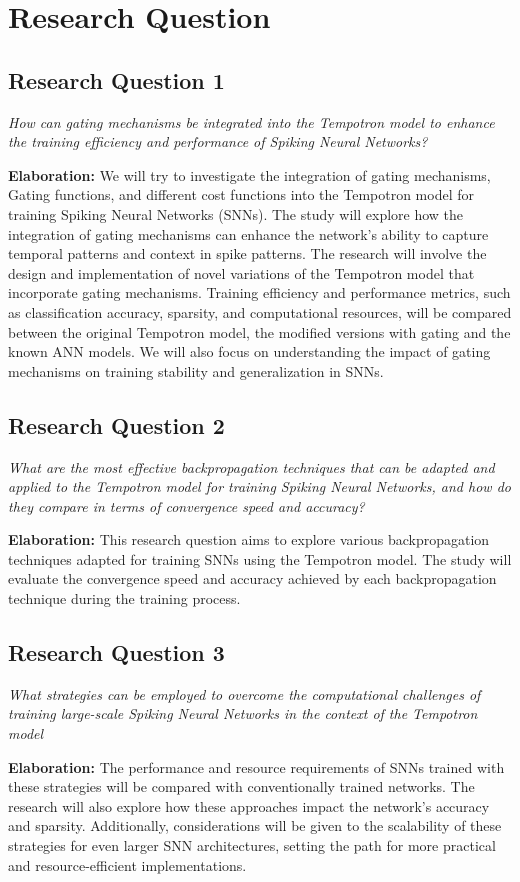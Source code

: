 \chapter{Research Question}
\label{chap:rq}

\section*{Research Question 1}
\textit{How can gating mechanisms be integrated into the Tempotron model to enhance the training efficiency and performance of Spiking Neural Networks?}

\textbf{Elaboration:}
We will try to investigate the integration of gating mechanisms, Gating functions, and different cost functions into the Tempotron model for training Spiking Neural Networks (SNNs). The study will explore how the integration of gating mechanisms can enhance the network's ability to capture temporal patterns and context in spike patterns. The research will involve the design and implementation of novel variations of the Tempotron model that incorporate gating mechanisms. Training efficiency and performance metrics, such as classification accuracy, sparsity, and computational resources, will be compared between the original Tempotron model, the modified versions with gating and the known ANN models. We will also focus on understanding the impact of gating mechanisms on training stability and generalization in SNNs.

\section*{Research Question 2}
\textit{What are the most effective backpropagation techniques that can be adapted and applied to the Tempotron model for training Spiking Neural Networks, and how do they compare in terms of convergence speed and accuracy?}

\textbf{Elaboration:}
This research question aims to explore various backpropagation techniques adapted for training SNNs using the Tempotron model. The study will evaluate the convergence speed and accuracy achieved by each backpropagation technique during the training process.

\section*{Research Question 3}
\textit{What strategies can be employed to overcome the computational challenges of training large-scale Spiking Neural Networks in the context of the Tempotron model}

\textbf{Elaboration:}
The performance and resource requirements of SNNs trained with these strategies will be compared with conventionally trained networks. The research will also explore how these approaches impact the network's accuracy and sparsity. Additionally, considerations will be given to the scalability of these strategies for even larger SNN architectures, setting the path for more practical and resource-efficient implementations.


